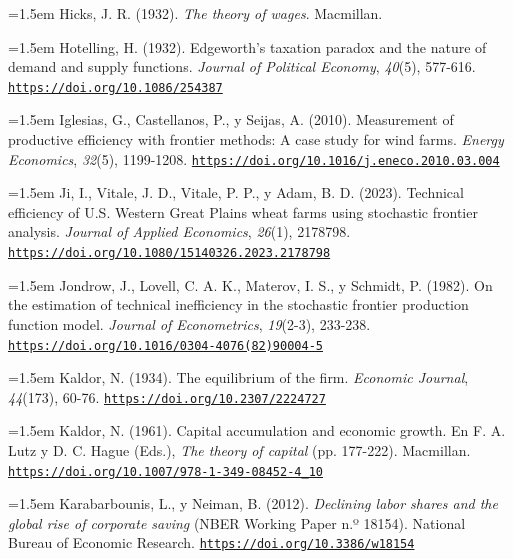 \documentclass[10pt,a4paper]{article}
\begin{document}
\noindent\hangindent=1.5em Hicks, J. R. (1932). \textit{The theory of wages}. Macmillan.

\noindent\hangindent=1.5em Hotelling, H. (1932). Edgeworth's taxation paradox and the nature of demand and supply functions. \textit{Journal of Political Economy}, \textit{40}(5), 577-616. \href{https://doi.org/10.1086/254387}{\nolinkurl{https://doi.org/10.1086/254387}}

\noindent\hangindent=1.5em Iglesias, G., Castellanos, P., y Seijas, A. (2010). Measurement of productive efficiency with frontier methods: A case study for wind farms. \textit{Energy Economics}, \textit{32}(5), 1199-1208. \href{https://doi.org/10.1016/j.eneco.2010.03.004}{\nolinkurl{https://doi.org/10.1016/j.eneco.2010.03.004}}

\noindent\hangindent=1.5em Ji, I., Vitale, J. D., Vitale, P. P., y Adam, B. D. (2023). Technical efficiency of U.S. Western Great Plains wheat farms using stochastic frontier analysis. \textit{Journal of Applied Economics}, \textit{26}(1), 2178798. \href{https://doi.org/10.1080/15140326.2023.2178798}{\nolinkurl{https://doi.org/10.1080/15140326.2023.2178798}}

\noindent\hangindent=1.5em Jondrow, J., Lovell, C. A. K., Materov, I. S., y Schmidt, P. (1982). On the estimation of technical inefficiency in the stochastic frontier production function model. \textit{Journal of Econometrics}, \textit{19}(2-3), 233-238. \href{https://doi.org/10.1016/0304-4076(82)90004-5}{\nolinkurl{https://doi.org/10.1016/0304-4076(82)90004-5}}

\noindent\hangindent=1.5em Kaldor, N. (1934). The equilibrium of the firm. \textit{Economic Journal}, \textit{44}(173), 60-76. \href{https://doi.org/10.2307/2224727}{\nolinkurl{https://doi.org/10.2307/2224727}}

\noindent\hangindent=1.5em Kaldor, N. (1961). Capital accumulation and economic growth. En F. A. Lutz y D. C. Hague (Eds.), \textit{The theory of capital} (pp. 177-222). Macmillan. \href{https://doi.org/10.1007/978-1-349-08452-4_10}{\nolinkurl{https://doi.org/10.1007/978-1-349-08452-4_10}}

\noindent\hangindent=1.5em Karabarbounis, L., y Neiman, B. (2012). \textit{Declining labor shares and the global rise of corporate saving} (NBER Working Paper n.º 18154). National Bureau of Economic Research. \href{https://doi.org/10.3386/w18154}{\nolinkurl{https://doi.org/10.3386/w18154}}
\end{document}
